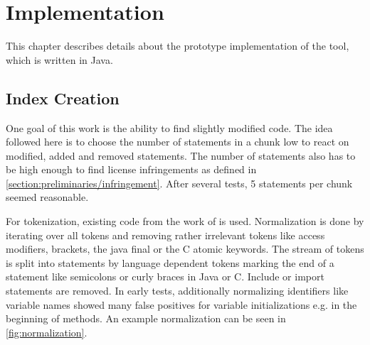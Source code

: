 

\chapter{Implementation}\label{chapter:implementation}
This chapter describes details about the prototype implementation of the tool, which is written in Java.

\section{Index Creation}\label{section:implementation/index_creation}
One goal of this work is the ability to find slightly modified code.
The idea followed here is to choose the number of statements in a chunk low to react on modified, added and removed statements.
The number of statements also has to be high enough to find license infringements as defined in \autoref{section:preliminaries/infringement}.
After several tests, 5 statements per chunk seemed reasonable.

For tokenization, existing code from the work of \cite{heinemann2014teamscale} is used.
Normalization is done by iterating over all tokens and removing rather irrelevant tokens like access modifiers, brackets, the java final or the C atomic keywords.
The stream of tokens is split into statements by language dependent tokens marking the end of a statement like semicolons or curly braces in Java or C.
Include or import statements are removed.
In early tests, additionally normalizing identifiers like variable names showed many false positives for variable initializations e.g. in the beginning of methods.
An example normalization can be seen in \autoref{fig:normalization}.

